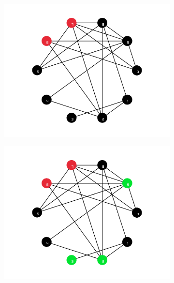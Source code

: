 \documentclass[diplomskirad]{fer}
\begin{document}
\begin{figure}
  \centering
  \begin{subfigure}[b]{0.4\linewidth}
    \includegraphics[scale=0.17]{images/colors_it3.png}
    \label{prvo_bojanje}
  \end{subfigure}
  \begin{subfigure}[b]{0.4\linewidth}
    \includegraphics[scale=0.17]{images/colors_it4.png}
    \label{drugo_bojanje}
  \end{subfigure}
  \bigskip
  \begin{subfigure}[b]{0.4\linewidth}

\end{subfigure}
\end{figure}
\end{document}
